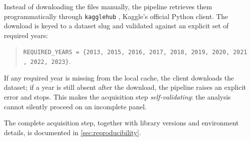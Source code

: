 Instead of downloading the files manually, the pipeline retrieves them programmatically through \texttt{kagglehub} \parencite{kagglehub}, Kaggle's official Python client. The download is keyed to a dataset slug and validated against an explicit set of required years:
\begin{quote}
	\texttt{REQUIRED\_YEARS\ =\ \{2013,\ 2015,\ 2016,\ 2017,\ 2018,\ 2019,\ 2020,\ 2021,\ 2022,\ 2023\}}.
\end{quote}
If any required year is missing from the local cache, the client downloads the dataset; if a year is still absent after the download, the pipeline raises an explicit error and stops. This makes the acquisition step \emph{self-validating}: the analysis cannot silently proceed on an incomplete panel.

The complete acquisition step, together with library versions and environment details, is documented in \cref{sec:reproducibility}.